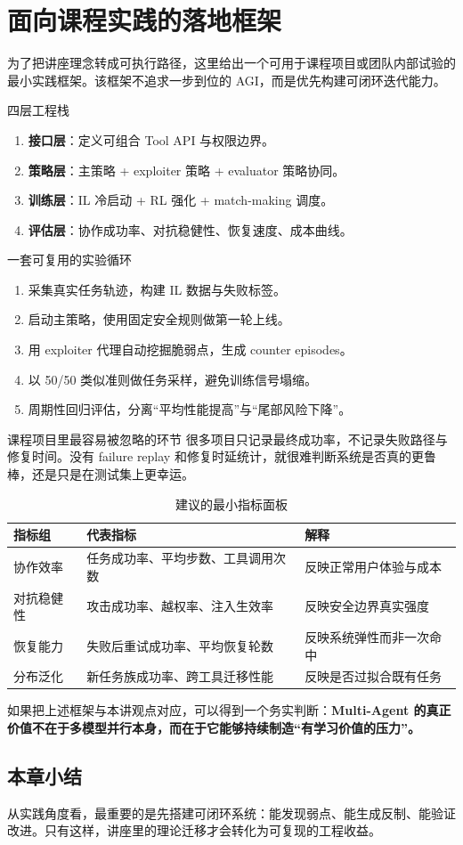 \section{面向课程实践的落地框架}

为了把讲座理念转成可执行路径，这里给出一个可用于课程项目或团队内部试验的最小实践框架。该框架不追求一步到位的 AGI，而是优先构建可闭环迭代能力。

\begin{importantbox}{四层工程栈}
\begin{enumerate}
    \item \textbf{接口层}：定义可组合 Tool API 与权限边界。
    \item \textbf{策略层}：主策略 + exploiter 策略 + evaluator 策略协同。
    \item \textbf{训练层}：IL 冷启动 + RL 强化 + match-making 调度。
    \item \textbf{评估层}：协作成功率、对抗稳健性、恢复速度、成本曲线。
\end{enumerate}
\end{importantbox}

\begin{knowledgebox}{一套可复用的实验循环}
\begin{enumerate}
    \item 采集真实任务轨迹，构建 IL 数据与失败标签。
    \item 启动主策略，使用固定安全规则做第一轮上线。
    \item 用 exploiter 代理自动挖掘脆弱点，生成 counter episodes。
    \item 以 50/50 类似准则做任务采样，避免训练信号塌缩。
    \item 周期性回归评估，分离``平均性能提高''与``尾部风险下降''。
\end{enumerate}
\end{knowledgebox}

\begin{warningbox}{课程项目里最容易被忽略的环节}
很多项目只记录最终成功率，不记录失败路径与修复时间。没有 failure replay 和修复时延统计，就很难判断系统是否真的更鲁棒，还是只是在测试集上更幸运。
\end{warningbox}

\begin{table}[H]
\centering
\caption{建议的最小指标面板}
\begin{tabular}{p{3.0cm}p{3.2cm}p{6.4cm}}
\toprule
指标组 & 代表指标 & 解释 \\
\midrule
协作效率 & 任务成功率、平均步数、工具调用次数 & 反映正常用户体验与成本 \\
对抗稳健性 & 攻击成功率、越权率、注入生效率 & 反映安全边界真实强度 \\
恢复能力 & 失败后重试成功率、平均恢复轮数 & 反映系统弹性而非一次命中 \\
分布泛化 & 新任务族成功率、跨工具迁移性能 & 反映是否过拟合既有任务 \\
\bottomrule
\end{tabular}
\end{table}

如果把上述框架与本讲观点对应，可以得到一个务实判断：\textbf{Multi-Agent 的真正价值不在于多模型并行本身，而在于它能够持续制造``有学习价值的压力''。}

\subsection{本章小结}
从实践角度看，最重要的是先搭建可闭环系统：能发现弱点、能生成反制、能验证改进。只有这样，讲座里的理论迁移才会转化为可复现的工程收益。

